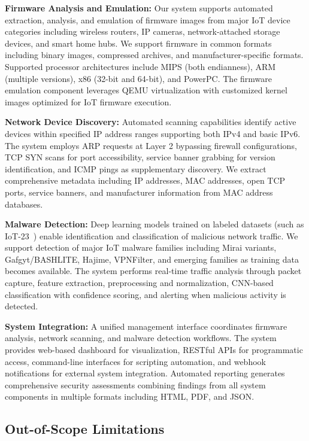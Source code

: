 \textbf{Firmware Analysis and Emulation:} Our system supports automated extraction, analysis, and emulation of firmware images from major IoT device categories including wireless routers, IP cameras, network-attached storage devices, and smart home hubs. We support firmware in common formats including binary images, compressed archives, and manufacturer-specific formats. Supported processor architectures include MIPS (both endianness), ARM (multiple versions), x86 (32-bit and 64-bit), and PowerPC. The firmware emulation component leverages QEMU virtualization with customized kernel images optimized for IoT firmware execution.

\textbf{Network Device Discovery:} Automated scanning capabilities identify active devices within specified IP address ranges supporting both IPv4 and basic IPv6. The system employs ARP requests at Layer 2 bypassing firewall configurations, TCP SYN scans for port accessibility, service banner grabbing for version identification, and ICMP pings as supplementary discovery. We extract comprehensive metadata including IP addresses, MAC addresses, open TCP ports, service banners, and manufacturer information from MAC address databases.

\textbf{Malware Detection:} Deep learning models trained on labeled datasets (such as IoT-23~\cite{stratosphere}) enable identification and classification of malicious network traffic. We support detection of major IoT malware families including Mirai variants, Gafgyt/BASHLITE, Hajime, VPNFilter, and emerging families as training data becomes available. The system performs real-time traffic analysis through packet capture, feature extraction, preprocessing and normalization, CNN-based classification with confidence scoring, and alerting when malicious activity is detected.

\textbf{System Integration:} A unified management interface coordinates firmware analysis, network scanning, and malware detection workflows. The system provides web-based dashboard for visualization, RESTful APIs for programmatic access, command-line interfaces for scripting automation, and webhook notifications for external system integration. Automated reporting generates comprehensive security assessments combining findings from all system components in multiple formats including HTML, PDF, and JSON.

\subsection{Out-of-Scope Limitations}

